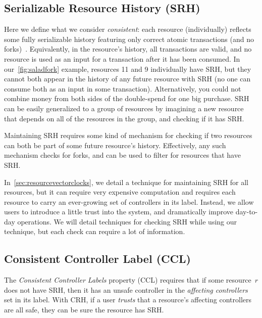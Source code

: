 \documentclass[a4paper,USenglish,cleveref, autoref, thm-restate, anonymous]{lipics-v2021}
\begin{document}
\subsection{Serializable Resource History (SRH)}
Here we define what we consider \emph{consistent}: each resource (individually) reflects some fully serializable history featuring only correct atomic transactions (and no forks)~\cite{serializability}. 
Equivalently, in the resource's history, all transactions are valid, and no resource is used as an input for a transaction after it has been consumed. 
In our~\cref{fig:saladfork} example, resources 11 and 9 individually have SRH, but they cannot both appear in the history of any future resource with SRH (no one can consume both as an input in some transaction).
Alternatively, you could not combine money from both sides of the double-spend for one big purchase.
SRH can be easily generalized to a group of resources by imagining a new resource that depends on all of the resources in the group, and checking if it has SRH.

Maintaining SRH requires some kind of mechanism for checking if two resources can both be part of some future resource's history. 
Effectively, any such mechanism checks for forks, and can be used to filter for resources that have SRH.


In~\cref{sec:resourcevectorclocks}, we detail a technique for maintaining SRH for all resources, but it can require very expensive computation and requires each resource to carry an ever-growing set of controllers in its label. 
Instead, we allow users to introduce a little trust into the system, and dramatically improve day-to-day operations.
We will detail techniques for checking SRH while using our technique, but each check can require a lot of information.

\subsection{Consistent Controller Label (CCL)}
The \emph{Consistent Controller Labels}  property (CCL) requires that if some resource~$r$ does not have SRH, then it has an unsafe controller in the \textit{affecting controllers} set in its label.
With CRH, if a user \textit{trusts} that a resource's affecting controllers are all safe, they can be sure the resource has SRH. 
\end{document}
